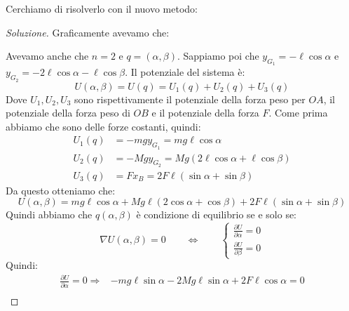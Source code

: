 \documentclass[11pt,a4paper,twoside]{article}
\theoremstyle{definition}
\newenvironment{sol}
	{\renewcommand\qedsymbol{$\blacksquare$}\begin{proof}[Soluzione]}
	{\end{proof}}
\begin{document}
Cerchiamo di risolverlo con il nuovo metodo:

\begin{sol}
	Graficamente avevamo che:
	\begin{center}
	\end{center}
	Avevamo anche che $n = 2$ e $q = (\alpha, \beta)$. Sappiamo poi che $y_{G_1} = -\ell \cos \alpha$ e $y_{G_2} = -2\ell \cos \alpha - \ell \cos \beta$. Il potenziale del sistema è:
	\[ U(\alpha,\beta)=U(q) = U_1(q) + U_2(q)+ U_3(q) \]
	Dove $U_1,U_2,U_3$ sono rispettivamente il potenziale della forza peso per $OA$, il potenziale della forza peso di $OB$ e il potenziale della forza $F$. Come prima abbiamo che sono delle forze costanti, quindi:
	\begin{align*}
		U_1(q) &= -mgy_{G_1} = mg\ell \cos \alpha\\
		U_2(q) &= -Mgy_{G_2} = Mg(2\ell \cos \alpha + \ell \cos \beta)\\
		U_3(q) &= Fx_B = 2F\ell(\sin \alpha + \sin \beta)
	\end{align*}
	Da questo otteniamo che:
	\[ U(\alpha, \beta) = mg\ell \cos \alpha + Mg\ell(2\cos \alpha + \cos \beta) + 2F\ell(\sin \alpha+ \sin \beta) \]
	Quindi abbiamo che $q(\alpha,\beta)$ è condizione di equilibrio se e solo se:
	\[ \nabla U(\alpha,\beta) = 0 \qquad \Leftrightarrow \qquad \begin{cases} \frac{\partial U}{\partial \alpha}=0\\ \frac{\partial U}{\partial \beta}=0 \end{cases} \]
	Quindi:
	\begin{align*}
		\frac{\partial U}{\partial \alpha} = 0 \Rightarrow & -mg\ell \sin \alpha - 2Mg\ell \sin \alpha + 2F\ell \cos \alpha = 0\\

\end{align*}
\end{sol}
\end{document}

